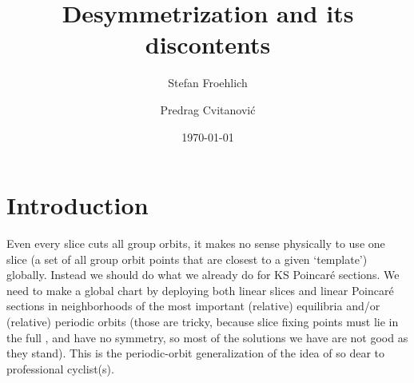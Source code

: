 \documentclass[aip,cha,graphicx]{revtex4-1}
\begin{document}
\title{Desymmetrization and its discontents}



\author{Stefan Froehlich}

\author{Predrag Cvitanovi\'{c}}

\date{\today}

\begin{abstract}
\end{abstract}


\maketitle %

\section{Introduction}
\label{sec:intro}

Even every slice cuts all group orbits, it makes no sense physically to
use one slice
(a set of all group orbit points that are closest to a given `template')
globally. Instead we should do what we already do for KS Poincar\'e sections.
We need to make a global chart by deploying both linear slices and linear
Poincar\'e sections in neighborhoods of the most important (relative)
equilibria and/or (relative) periodic orbits (those are tricky, because
slice fixing points must lie in the full \statesp, and have no symmetry,
so most of the solutions we have are not good as they stand). This is the
periodic-orbit generalization of the idea of
so dear to professional cyclist(s).
\end{document}
